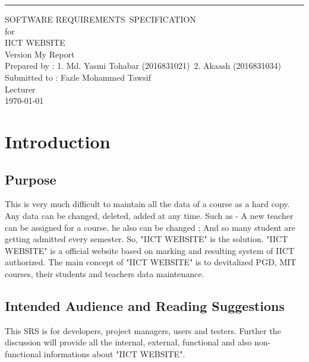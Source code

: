 \documentclass{scrreprt}
\date{}
\def\myversion{My Report}
\begin{document}
    
    \begin{flushright}
        \rule{16cm}{5pt}\vskip1cm
        \begin{bfseries}
            \Huge{SOFTWARE REQUIREMENTS\ SPECIFICATION}\
            \vspace{1.5cm} 
            \\for\\
            \vspace{1.5cm}
            IICT WEBSITE\\
            \vspace{1.5cm}
            \LARGE{Version \myversion}\\
            \vspace{1.5cm}
            Prepared by : 1. Md. Yasmi Tohabar (2016831021)\
            2. Akaash (2016831034)\\
            \vspace{1.5cm}
            Submitted to : Fazle Mohammed Tawsif \\Lecturer\\
            \vspace{1.5cm}
            \today\
        \end{bfseries}
    \end{flushright}
    
    \tableofcontents
    
    \chapter{Introduction}
    
    \section{Purpose}
    This is very much difficult to maintain all the data of a course as a hard copy. Any data can be changed, deleted, added at any time. Such as - A new teacher can be assigned for a course, he also can be changed ; And so many student are getting admitted every semester. So, "IICT WEBSITE" is the solution. "IICT WEBSITE" is a official website based on marking and resulting system of IICT authorized. The main concept of "IICT WEBSITE" is to devitalized PGD, MIT courses, their students and teachers data maintenance. 
    \section{Intended Audience and Reading Suggestions}
    This SRS is for developers, project managers, users and testers. Further the discussion will provide all the internal, external, functional and also non-functional informations about "IICT WEBSITE".
    
\end{document}
